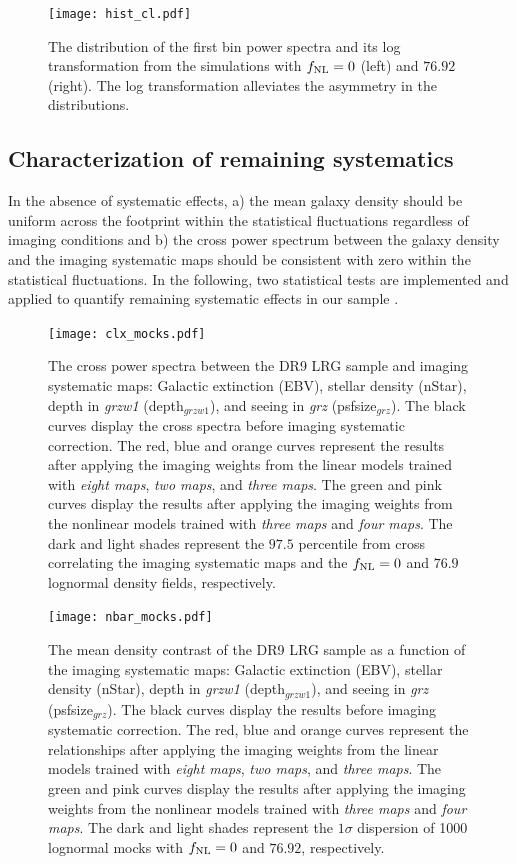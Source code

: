 \begin{figure}
\centering
\texttt{[image: hist\_cl.pdf]}
\caption{The distribution of the first bin power spectra and its log transformation from the simulations with $f_{\rm NL}=0$ (left) and $76.92$ (right). The log transformation alleviates the asymmetry in the distributions.}\label{fig:histcell}
\end{figure}


\subsection{Characterization of remaining systematics}
\label{ssec:characterization}

In the absence of systematic effects, a) the mean galaxy density should be uniform across the footprint within the statistical fluctuations regardless of imaging conditions and b) the cross power spectrum between the galaxy density and the imaging systematic maps should be consistent with zero within the statistical fluctuations. In the following, two statistical tests are implemented and applied to quantify remaining systematic effects in our sample \cite[see, also,][]{rezaie2021primordial}.

\begin{figure}
\centering
\texttt{[image: clx\_mocks.pdf]}
\caption{The cross power spectra between the DR9 LRG sample and imaging systematic maps: Galactic extinction (EBV), stellar density (nStar), depth in \textit{grzw1} (depth$_{grzw1}$), and seeing in \textit{grz} (psfsize$_{grz}$). The black curves display the cross spectra before imaging systematic correction. The red, blue and orange curves represent the results after applying the imaging weights from the linear models trained with \textit{eight maps}, \textit{two maps}, and \textit{three maps}. The green and pink curves display the results after applying the imaging weights from the nonlinear models trained with \textit{three maps} and \textit{four maps}. The dark and light shades represent the $97.5$ percentile from cross correlating the imaging systematic maps and the $f_{\rm NL}=0$ and $76.9$ lognormal density fields, respectively.}\label{fig:clxmock}
\end{figure}

\begin{figure}
\centering
\texttt{[image: nbar\_mocks.pdf]}
\caption{The mean density contrast of the DR9 LRG sample as a function of the imaging systematic maps: Galactic extinction (EBV), stellar density (nStar), depth in \textit{grzw1} (depth$_{grzw1}$), and seeing in \textit{grz} (psfsize$_{grz}$). The black curves display the results before imaging systematic correction. The red, blue and orange curves represent the relationships after applying the imaging weights from the linear models trained with \textit{eight maps}, \textit{two maps}, and \textit{three maps}. The green and pink curves display the results after applying the imaging weights from the nonlinear models trained with \textit{three maps} and \textit{four maps}. The dark and light shades represent the $1\sigma$ dispersion of 1000 lognormal mocks with $f_{\rm NL}=0$ and $76.92$, respectively.}\label{fig:nbarmock}
\end{figure}


